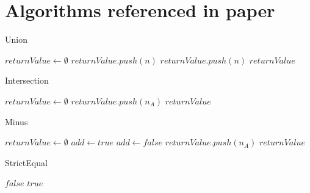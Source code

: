 \chapter{Algorithms referenced in paper}

\begin{algorithm}
	\caption{Union}\label{Union}
	\begin{algorithmic}[1]
		\State $returnValue \gets \emptyset$ 
		\State $returnValue.push(n)$
		\EndIf
		\EndFor
		\State $returnValue.push(n)$
		\EndIf
		\EndFor
		\State \Return $returnValue$ 
		\EndFunction
	\end{algorithmic}
\end{algorithm}

\begin{algorithm}
	\caption{Intersection}\label{Intersection}
	\begin{algorithmic}[1]
		\State $returnValue \gets \emptyset$ 
		\State $returnValue.push(n_A)$
		\EndIf
		\EndFor
		\EndFor
		\State \Return $returnValue$ 
		\EndFunction
	\end{algorithmic}
\end{algorithm}

\begin{algorithm}
	\caption{Minus}\label{Minus}
	\begin{algorithmic}[1]
		\State $returnValue \gets \emptyset$
		\State $add \gets true$
		\State $add \gets false$
		\EndIf
		\EndFor
		\State $returnValue.push(n_A)$
		\EndIf
		\EndFor
		\State \Return $returnValue$
		\EndFunction
	\end{algorithmic}
\end{algorithm}

\begin{algorithm}
	\caption{StrictEqual}\label{StrictEqual}
	\begin{algorithmic}[1]
		\State \Return $false$
		\EndIf
		\EndFor
		\EndFor
		\State \Return $true$
		\EndFunction
	\end{algorithmic}
\end{algorithm}

